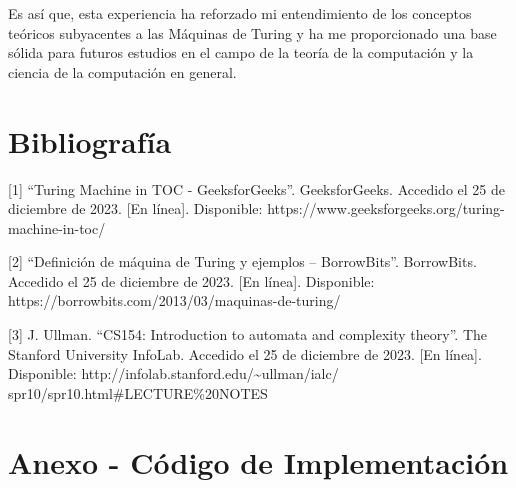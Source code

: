 \documentclass[11pt]{article} %
\begin{document}
	Es así que, esta experiencia ha reforzado mi entendimiento de los conceptos teóricos subyacentes a las Máquinas de Turing y ha me proporcionado una base sólida para futuros estudios en el campo de la teoría de la computación y la ciencia de la computación en general.
	
		
	\section*{Bibliografía}
	
	
	[1] “Turing Machine in TOC - GeeksforGeeks”. GeeksforGeeks. Accedido el 25 de diciembre de 2023. [En línea]. Disponible: https://www.geeksforgeeks.org/turing-machine-in-toc/
	
	
	[2] “Definición de máquina de Turing y ejemplos – BorrowBits”. BorrowBits. Accedido el 25 de diciembre de 2023. [En línea]. Disponible: https://borrowbits.com/2013/03/maquinas-de-turing/
	
	[3] J. Ullman. “CS154: Introduction to automata and complexity theory”. The Stanford University InfoLab. Accedido el 25 de diciembre de 2023. [En línea]. Disponible: http://infolab.stanford.edu/\~{}ullman/ialc/
	spr10/spr10.html\#LECTURE\%20NOTES
	
	
	\newpage
	\section{Anexo - Código de Implementación}
	
\end{document}
